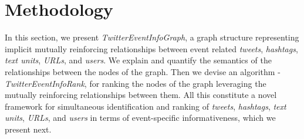 \section{Methodology\label{methodology}}
In this section, we present \textit{TwitterEventInfoGraph}, a graph structure representing implicit mutually reinforcing relationships between event related \textit{tweets}, \textit{hashtags}, \textit{text units}, \textit{URLs}, and \textit{users}. We explain and quantify the semantics of the relationships between the nodes of the graph. Then we devise an algorithm - \textit{TwitterEventInfoRank}, for ranking the nodes of the graph leveraging the mutually reinforcing relationships between them. All this constitute a novel framework  for simultaneous identification and ranking of \textit{tweets}, \textit{hashtags}, \textit{text units}, \textit{URLs}, and \textit{users} in terms of event-specific informativeness, which we present next.

 


